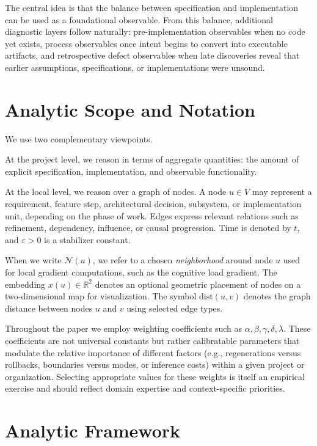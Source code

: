 \documentclass[twocolumn]{aastex701}
\begin{document}
The central idea is that the balance between specification and implementation
can be used as a foundational observable.
From this balance, additional diagnostic layers follow naturally:
pre-implementation observables when no code yet exists,
process observables once intent begins to convert into executable artifacts,
and retrospective defect observables when late discoveries reveal
that earlier assumptions, specifications, or implementations were unsound.

\section{Analytic Scope and Notation}

We use two complementary viewpoints.

At the project level, we reason in terms of aggregate quantities:
the amount of explicit specification, implementation, and observable functionality.

At the local level, we reason over a graph of nodes.
A node $u \in V$ may represent a requirement, feature step,
architectural decision, subsystem, or implementation unit,
depending on the phase of work.
Edges express relevant relations such as refinement, dependency,
influence, or causal progression.
Time is denoted by $t$, and $\varepsilon > 0$ is a stabilizer constant.

When we write $\mathcal{N}(u)$, we refer to a chosen \emph{neighborhood}
around node $u$ used for local gradient computations, such as the
cognitive load gradient.
The embedding $x(u)\in\mathbb{R}^2$ denotes an optional geometric placement
of nodes on a two-dimensional map for visualization.
The symbol $\mathrm{dist}(u,v)$ denotes the graph distance between nodes
$u$ and $v$ using selected edge types.

Throughout the paper we employ weighting coefficients such as
$\alpha,\beta,\gamma,\delta,\lambda$.
These coefficients are not universal constants but rather
calibratable parameters that modulate the relative importance of
different factors (e.g., regenerations versus rollbacks, boundaries versus
modes, or inference costs) within a given project or organization.
Selecting appropriate values for these weights is itself an empirical
exercise and should reflect domain expertise and context-specific
priorities.

\section{Analytic Framework}
\end{document}
